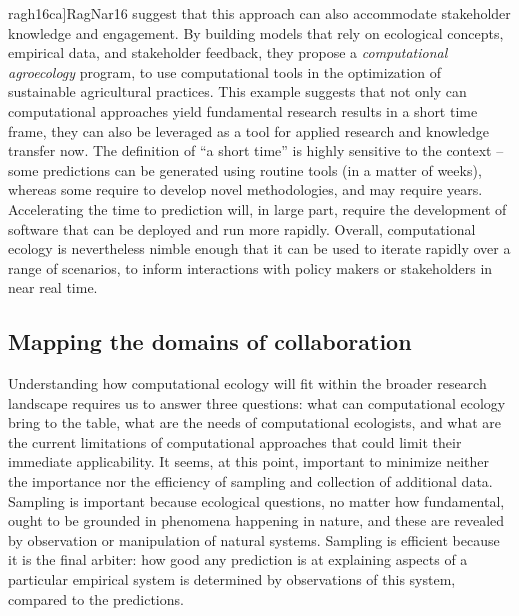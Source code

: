 \documentclass[11pt,serif]{article}
\begin{document}
\color{gray}{[}ragh16ca{]}\color{black}\color{purple}RagNar16\color{black}
suggest that this approach can also accommodate stakeholder knowledge
and engagement. By building models that rely on ecological concepts,
empirical data, and stakeholder feedback, they propose a
\emph{computational agroecology} program, to use computational tools in
the optimization of sustainable agricultural practices. This example
suggests that not only can computational approaches yield fundamental
research results in a short time frame, they can also be leveraged as a
tool for applied research and knowledge transfer now. The definition of
``a short time'' is highly sensitive to the context -- some predictions
can be generated using routine tools (in a matter of weeks), whereas
some require to develop novel methodologies, and may require years.
Accelerating the time to prediction will, in large part, require the
development of software that can be deployed and run more rapidly.
Overall, computational ecology is nevertheless nimble enough that it can
be used to iterate rapidly over a range of scenarios, to inform
interactions with policy makers or stakeholders in near real time.

\subsection{Mapping the domains of
collaboration}\label{mapping-the-domains-of-collaboration}

Understanding how computational ecology will fit within the broader
research landscape requires us to answer three questions: what can
computational ecology bring to the table, what are the needs of
computational ecologists, and what are the current limitations of
computational approaches that could limit their immediate applicability.
It seems, at this point, important to minimize neither the importance
nor the efficiency of sampling and collection of additional data.
Sampling is important because ecological questions, no matter how
fundamental, ought to be grounded in phenomena happening in nature, and
these are revealed by observation or manipulation of natural systems.
Sampling is efficient because it is the final arbiter: how good any
prediction is at explaining aspects of a particular empirical system is
determined by observations of this system, compared to the predictions.
\end{document}
